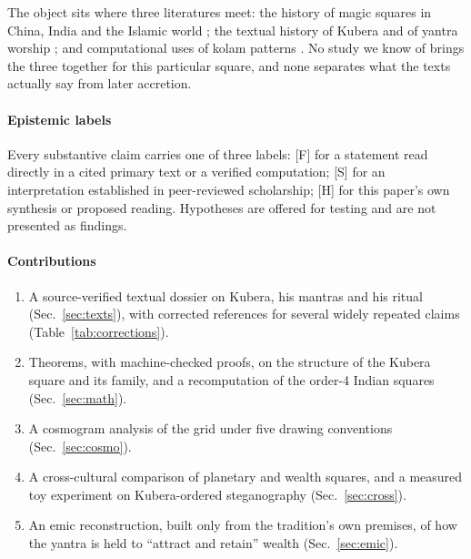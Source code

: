 \documentclass[pdflatex,sn-basic]{sn-jnl}
\theoremstyle{thmstyleone}
\theoremstyle{thmstylethree}
\newcommand{\Fact}{\textsf{[F]}}
\newcommand{\Schol}{\textsf{[S]}}
\newcommand{\Hyp}{\textsf{[H]}}
\begin{document}
The object sits where three literatures meet: the history of magic squares in China, India and the Islamic world \citep{cammann1960,cammann1961,cammann1969a,cammann1969b,hayashi1987,datta1992,swetz2008}; the textual history of Kubera and of yantra worship \citep{sutherland1991,buhnemann2000}; and computational uses of kolam patterns \citep{amirtharajan2013}. No study we know of brings the three together for this particular square, and none separates what the texts actually say from later accretion.

\paragraph*{Epistemic labels} Every substantive claim carries one of three labels: \Fact{} for a statement read directly in a cited primary text or a verified computation; \Schol{} for an interpretation established in peer-reviewed scholarship; \Hyp{} for this paper's own synthesis or proposed reading. Hypotheses are offered for testing and are not presented as findings.

\paragraph*{Contributions}
\begin{enumerate}
\item A source-verified textual dossier on Kubera, his mantras and his ritual (Sec.~\ref{sec:texts}), with corrected references for several widely repeated claims (Table~\ref{tab:corrections}).
\item Theorems, with machine-checked proofs, on the structure of the Kubera square and its family, and a recomputation of the order-4 Indian squares (Sec.~\ref{sec:math}).
\item A cosmogram analysis of the grid under five drawing conventions (Sec.~\ref{sec:cosmo}).
\item A cross-cultural comparison of planetary and wealth squares, and a measured toy experiment on Kubera-ordered steganography (Sec.~\ref{sec:cross}).
\item An emic reconstruction, built only from the tradition's own premises, of how the yantra is held to ``attract and retain'' wealth (Sec.~\ref{sec:emic}).
\end{enumerate}

\end{document}

